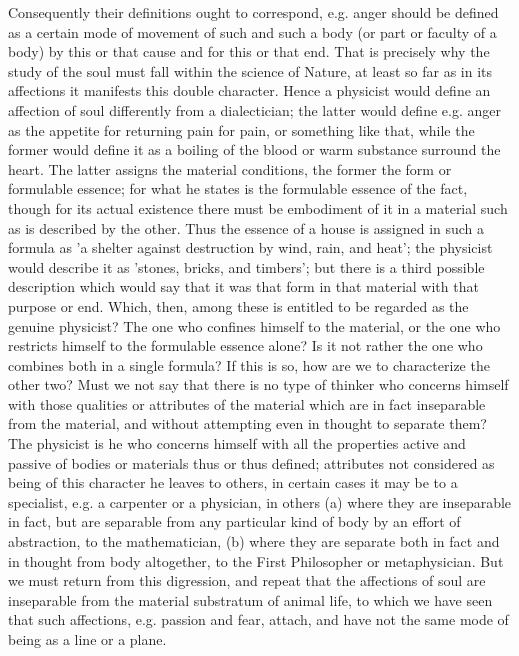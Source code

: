 Consequently their definitions ought to correspond, e.g. anger should
be defined as a certain mode of movement of such and such a body (or
part or faculty of a body) by this or that cause and for this or that
end. That is precisely why the study of the soul must fall within
the science of Nature, at least so far as in its affections it manifests
this double character. Hence a physicist would define an affection
of soul differently from a dialectician; the latter would define e.g.
anger as the appetite for returning pain for pain, or something like
that, while the former would define it as a boiling of the blood or
warm substance surround the heart. The latter assigns the material
conditions, the former the form or formulable essence; for what he
states is the formulable essence of the fact, though for its actual
existence there must be embodiment of it in a material such as is
described by the other. Thus the essence of a house is assigned in
such a formula as 'a shelter against destruction by wind, rain, and
heat'; the physicist would describe it as 'stones, bricks, and timbers';
but there is a third possible description which would say that it
was that form in that material with that purpose or end. Which, then,
among these is entitled to be regarded as the genuine physicist? The
one who confines himself to the material, or the one who restricts
himself to the formulable essence alone? Is it not rather the one
who combines both in a single formula? If this is so, how are we to
characterize the other two? Must we not say that there is no type
of thinker who concerns himself with those qualities or attributes
of the material which are in fact inseparable from the material, and
without attempting even in thought to separate them? The physicist
is he who concerns himself with all the properties active and passive
of bodies or materials thus or thus defined; attributes not considered
as being of this character he leaves to others, in certain cases it
may be to a specialist, e.g. a carpenter or a physician, in others
(a) where they are inseparable in fact, but are separable from any
particular kind of body by an effort of abstraction, to the mathematician,
(b) where they are separate both in fact and in thought from body
altogether, to the First Philosopher or metaphysician. But we must
return from this digression, and repeat that the affections of soul
are inseparable from the material substratum of animal life, to which
we have seen that such affections, e.g. passion and fear, attach,
and have not the same mode of being as a line or a plane.

